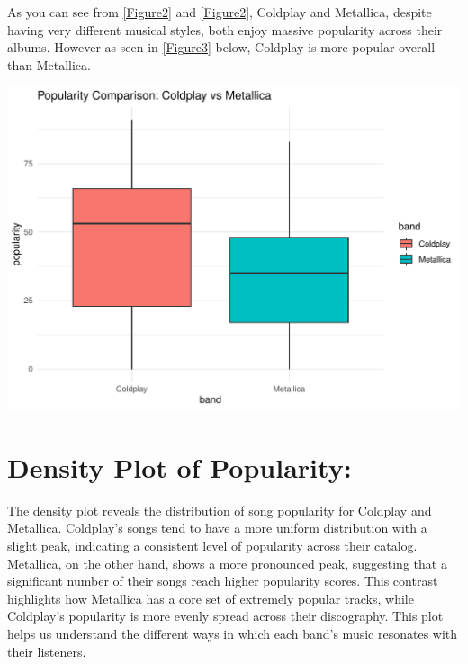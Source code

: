 \documentclass[12pt,preprint, authoryear]{elsarticle}
\let\origfigure\figure
\let\endorigfigure\endfigure
\renewenvironment{figure}[1][2] {
    \expandafter\origfigure\expandafter[H]
} {
    \endorigfigure
}
\numberwithin{equation}{section}
\numberwithin{figure}{section}
\numberwithin{table}{section}
\begin{document}
As you can see from \ref{Figure2} and \ref{Figure2}, Coldplay and
Metallica, despite having very different musical styles, both enjoy
massive popularity across their albums. However as seen in \ref{Figure3}
below, Coldplay is more popular overall than Metallica.

\begin{figure}

{\centering \includegraphics{README_files/figure-latex/unnamed-chunk-3-1} 

}

\caption{Comparing both Band's Popularity\label{Figure3}}\label{fig:unnamed-chunk-3}
\end{figure}

\hypertarget{density-plot-of-popularity}{%
\section{Density Plot of Popularity:}\label{density-plot-of-popularity}}

The density plot reveals the distribution of song popularity for
Coldplay and Metallica. Coldplay's songs tend to have a more uniform
distribution with a slight peak, indicating a consistent level of
popularity across their catalog. Metallica, on the other hand, shows a
more pronounced peak, suggesting that a significant number of their
songs reach higher popularity scores. This contrast highlights how
Metallica has a core set of extremely popular tracks, while Coldplay's
popularity is more evenly spread across their discography. This plot
helps us understand the different ways in which each band's music
resonates with their listeners.
\end{document}
